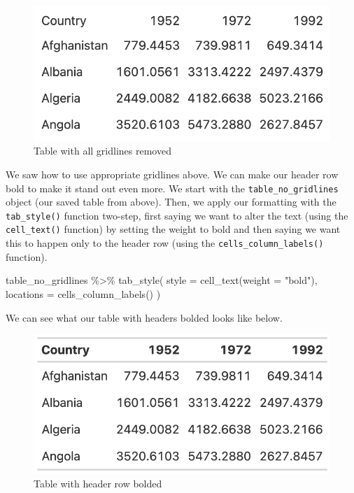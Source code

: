 \documentclass[
]{book}
\newenvironment{Shaded}{\begin{snugshade}}{\end{snugshade}}
\newcommand{\AttributeTok}[1]{\textcolor[rgb]{0.77,0.63,0.00}{#1}}
\newcommand{\FunctionTok}[1]{\textcolor[rgb]{0.00,0.00,0.00}{#1}}
\newcommand{\NormalTok}[1]{#1}
\newcommand{\SpecialCharTok}[1]{\textcolor[rgb]{0.00,0.00,0.00}{#1}}
\newcommand{\StringTok}[1]{\textcolor[rgb]{0.31,0.60,0.02}{#1}}
\begin{document}
\begin{figure}
\includegraphics[width=1\linewidth]{nostarch/temp/F05004} \caption{Table with all gridlines removed}\label{fig:unnamed-chunk-14}
\end{figure}

We saw how to use appropriate gridlines above. We can make our header row bold to make it stand out even more. We start with the \texttt{table\_no\_gridlines} object (our saved table from above). Then, we apply our formatting with the \texttt{tab\_style()} function two-step, first saying we want to alter the text (using the \texttt{cell\_text()} function) by setting the weight to bold and then saying we want this to happen only to the header row (using the \texttt{cells\_column\_labels()} function).

\begin{Shaded}
\begin{Highlighting}[]
\NormalTok{table\_no\_gridlines }\SpecialCharTok{\%\textgreater{}\%} 
  \FunctionTok{tab\_style}\NormalTok{(}
    \AttributeTok{style =} \FunctionTok{cell\_text}\NormalTok{(}\AttributeTok{weight =} \StringTok{"bold"}\NormalTok{),}
    \AttributeTok{locations =} \FunctionTok{cells\_column\_labels}\NormalTok{()}
\NormalTok{  )}
\end{Highlighting}
\end{Shaded}

We can see what our table with headers bolded looks like below.

\begin{figure}
\includegraphics[width=1\linewidth]{nostarch/temp/F05005} \caption{Table with header row bolded}\label{fig:unnamed-chunk-17}
\end{figure}
\end{document}
